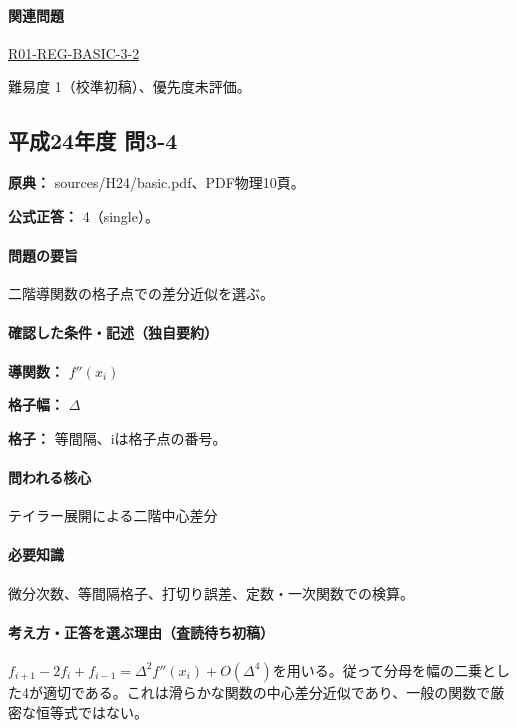 \paragraph{関連問題} \hyperref[q:r01-reg-basic-3-2]{R01-REG-BASIC-3-2}

\par 難易度 1（校準初稿）、優先度未評価。

\subsection{平成24年度 問3-4}
\label{q:h24-reg-basic-3-4}

\noindent\textbf{原典：} sources/H24/basic.pdf、PDF物理10頁。

\textbf{公式正答：} 4（single）。

\paragraph{問題の要旨} 二階導関数の格子点での差分近似を選ぶ。

\paragraph{確認した条件・記述（独自要約）}\mbox{}\par

\noindent\textbf{導関数：} \(f''(x_i)\)\par

\noindent\textbf{格子幅：} \(\Delta\)\par

\noindent\textbf{格子：} 等間隔、iは格子点の番号。\par

\paragraph{問われる核心} テイラー展開による二階中心差分

\paragraph{必要知識} 微分次数、等間隔格子、打切り誤差、定数・一次関数での検算。

\paragraph{考え方・正答を選ぶ理由（査読待ち初稿）} \(f_{i+1}-2f_i+f_{i-1}=\Delta^2f''(x_i)+O(\Delta^4)\)を用いる。従って分母を幅の二乗とした4が適切である。これは滑らかな関数の中心差分近似であり、一般の関数で厳密な恒等式ではない。

